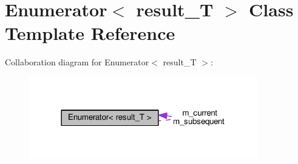 \hypertarget{classEnumerator}{}\section{Enumerator$<$ result\+\_\+T $>$ Class Template Reference}
\label{classEnumerator}


Collaboration diagram for Enumerator$<$ result\+\_\+T $>$\+:\nopagebreak
\begin{figure}[H]
\begin{center}
\leavevmode
\includegraphics[width=282pt]{classEnumerator__coll__graph}
\end{center}
\end{figure}
